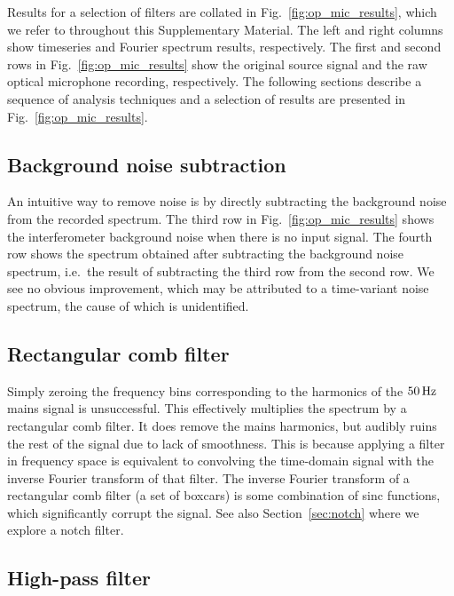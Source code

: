 \documentclass[aps,pra,superscriptaddress,reprint,nofootinbib]{revtex4-1}
\begin{document}
Results for a selection of filters are collated in Fig.~\ref{fig:op_mic_results}, which we refer to throughout this Supplementary Material. 
The left and right columns show timeseries and Fourier spectrum results, respectively. 
The first and second rows in Fig.~\ref{fig:op_mic_results} show the original source signal and the raw optical microphone recording, respectively. 
The following sections describe a sequence of analysis techniques and a selection of results are presented in Fig.~\ref{fig:op_mic_results}.



\subsection{Background noise subtraction}

An intuitive way to remove noise is by directly subtracting the background noise from the recorded spectrum. 
The third row in Fig.~\ref{fig:op_mic_results} shows the interferometer background noise when there is no input signal.
The fourth row shows the spectrum obtained after subtracting the background noise spectrum, i.e.\ the result of subtracting the third row from the second row. 
We see no obvious improvement, which may be attributed to a time-variant noise spectrum, the cause of which is unidentified. 



\subsection{Rectangular comb filter}

Simply zeroing the frequency bins corresponding to the harmonics of the $50\,{\rm Hz}$ mains signal is unsuccessful. 
This effectively multiplies the spectrum by a rectangular comb filter. 
It does remove the mains harmonics, but audibly ruins the rest of the signal due to lack of smoothness. 
This is because applying a filter in frequency space is equivalent to convolving the time-domain signal with the inverse Fourier transform of that filter. 
The inverse Fourier transform of a rectangular comb filter (a set of boxcars) is some combination of sinc functions, which significantly corrupt the signal. 
See also Section~\ref{sec:notch} where we explore a notch filter. 



\subsection{High-pass filter}
\end{document}
